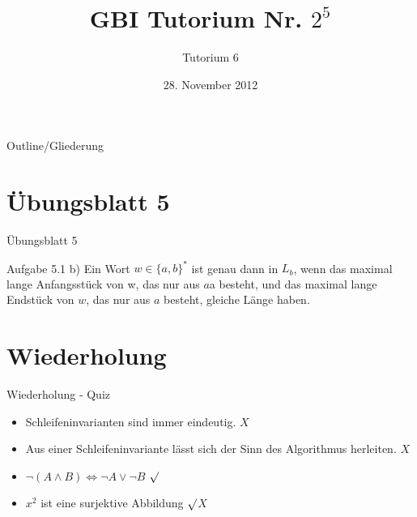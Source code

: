 

\title[Tutorium 6]{GBI Tutorium Nr. $2^5$}
\subtitle{Tutorium 6}
\date{28. November 2012}






	\begin{frame}
		\titlepage
	\end{frame}

	\begin{frame}{Outline/Gliederung}
		\tableofcontents
	\end{frame}
	
	
	
	\section{\"Ubungsblatt 5}
	\begin{frame} {Übungsblatt 5}
		\begin{block}{Aufgabe 5.1 b)}
			Ein Wort $w \in \{a,b\}^*$ ist genau dann in $L_b$, wenn das maximal lange Anfangsstück von w, das nur aus $a$a besteht, und das maximal lange Endstück von $w$, das nur aus $a$ besteht, gleiche Länge haben.
		\end{block}
	\end{frame}	
		
	
	
	
	\section{Wiederholung} 
	\begin{frame} {Wiederholung - Quiz}
		\begin{itemize}
			\item Schleifeninvarianten sind immer eindeutig. 
			\only<2-> {\color{red}$X$}\\
			\color{black}
					
			\item Aus einer Schleifeninvariante lässt sich der Sinn des Algorithmus herleiten.
			\only<3-> {\color{red}$X$}\\
			\color{black}
	
			\item $\neg (A \land B) \Leftrightarrow \neg A \lor \neg B$
			\only<4-> {\color{darkgreen}$\surd$}\\
			\color{black}
			
			\item $x^2$ ist eine surjektive Abbildung
			\only<5-> {\color{darkgreen}$\surd$\color{red}$X$}\\
			\color{black}
		\end{itemize}
	\end{frame}
	
